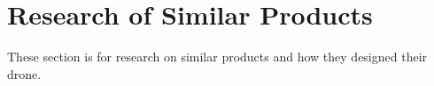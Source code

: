 \chapter{Research of Similar Products}
These section is for research on similar products and how they designed their drone.